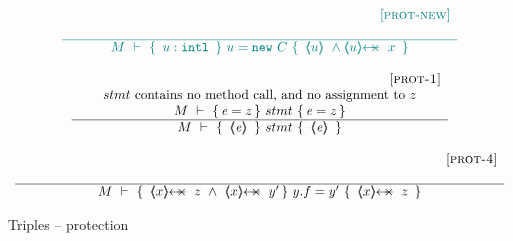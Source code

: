 \begin{figure}[tht]
$
\begin{array}{c}
 \sdN{\inferruleSD{\hspace{2.3cm} [\sc{prot-new}]}
	{	}
	{	 
 	\hproves{M} 
 						{\  \internal {u}   \ }
 					{\  u = \prg{new}\ C \ }
 						  { \  \inside{u}\  \wedge  \protectedFrom{u}{x} \ } 
 	}
}
\\
\\
	{{\inferruleSD{\hspace{2.3cm} [\sc{prot-1}]}
	{   stmt \ \mbox{contains no method call, and no assignment to $z$}
	\\
	{\hproves{M}  {\re = z} {\ stmt\ }{ \re=z} }
	}
	{\hproves{M} 
						{\  \inside{\re}  \ }
						{\  stmt \ }
						{\  \inside{\re}\ }
	}
}}
\\
\\
%
        {\inferruleSD{\hspace{5.3cm} [\sc{prot-4}]}
	{ }
	{\hproves{M} 
						{\ \protectedFrom{x}{z} \ \wedge \   \protectedFrom{x}{y'} }
						{\ y.f=y'\ }
						{\ \protectedFrom{x}{z} \ }
	}
}	 
\end{array}
 $
\caption{Triples -- protection}
\label{f:protection}
\end{figure}







